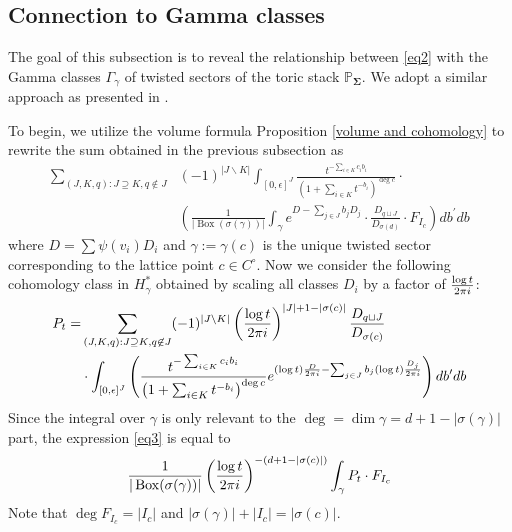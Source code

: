 \documentclass[11pt,reqno]{amsart}
\def\PP {{\mathbb P}}
\theoremstyle{definition}
\numberwithin{equation}{section}
\begin{document}
\subsection{Connection to Gamma classes}\label{relate to gamma class}

The goal of this subsection is to reveal the relationship between \eqref{eq2} with the Gamma classes $\Gamma_{\gamma}$ of twisted sectors of the toric stack $\PP_{\mathbf{\Sigma}}$. We adopt a similar approach as presented in \cite{AGIS}.
 
 \smallskip
 
To begin, we utilize the volume formula Proposition \ref{volume and cohomology} to rewrite the sum obtained in the previous subsection as
\begin{equation}\label{eq3}
	\begin{aligned}
	\sum_{(J,K,q):J\supseteq K,q\not\in J}&(-1)^{|J\backslash K|}\int_{[0,\epsilon]^J}\frac{t^{-\sum_{i\in K}c_ib_i}}{\left(1+\sum_{i\in K}t^{-b_i}\right)^{\deg c}}\cdot \\
	&\left(\frac{1}{|\operatorname{Box}(\sigma(\gamma))|}\int_{\gamma}e^{D-\sum_{j\in J}b_j D_j}\cdot\frac{D_{q\sqcup J}}{D_{\sigma(d)}}\cdot F_{I_c}\right)db^{\prime}db
\end{aligned}
\end{equation}
where $D=\sum\psi(v_i)D_i$ and $\gamma:=\gamma(c)$ is the unique twisted sector corresponding to the lattice point $c\in C^{\circ}$. Now we consider the following cohomology class in $H_{\gamma}^*$ obtained by scaling all classes $D_i$ by a factor of $\frac{\log t}{2\pi{\rm i}}$:
\begin{align*}
	P_t=&\sum_{(J,K,q):J\supseteq K,q\not\in J}(-1)^{|J\backslash K|}\left(\frac{\log t}{2\pi{\rm i}}\right)^{|J|+1-|\sigma(c)|}\frac{D_{q\sqcup J}}{D_{\sigma(c)}}\\
	&\cdot\int_{[0,\epsilon]^J}\left(\frac{t^{-\sum_{i\in K}c_ib_i}}{\left(1+\sum_{i\in K}t^{-b_i}\right)^{\deg c}}e^{(\log t)\frac{D}{2\pi{\rm i}}-\sum_{j\in J}b_j (\log t)\frac{D_j}{2\pi{\rm i}}}\right)db^{\prime}db
\end{align*}
Since the integral over $\gamma$ is only relevant to the $\deg=\dim\gamma=d+1-|\sigma(\gamma)|$ part, the expression \eqref{eq3} is equal to
\begin{align}\label{eq4}
	\frac{1}{|\operatorname{Box}(\sigma(\gamma))|}\left(\frac{\log t}{2\pi{\rm i}}\right)^{-(d+1-|\sigma(c)|)}\int_{\gamma} P_t\cdot F_{I_c}
\end{align}
Note that $\deg F_{I_c}=|I_c|$ and $|\sigma(\gamma)|+|I_c|=|\sigma(c)|$.
\end{document}
